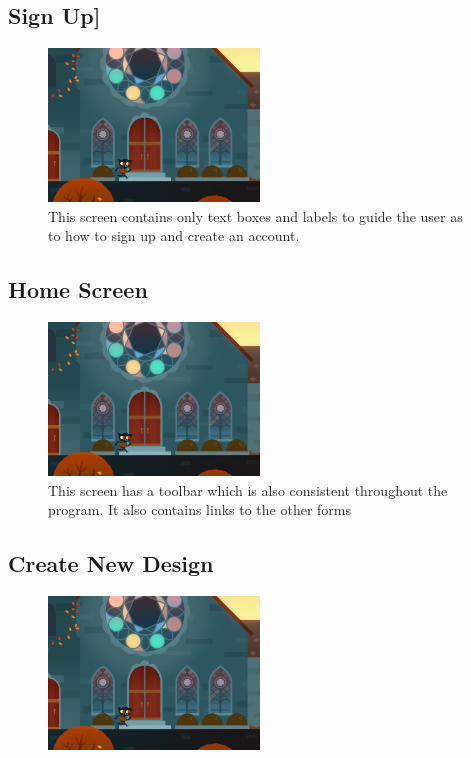 \documentclass[oneside,openany,11pt,a4paper]{report}
\begin{document}
\subsection{Sign Up]}
\begin{figure}[H]
	\centering
	\includegraphics[width=0.5\textwidth]{sd3.png}
	\caption{This screen contains only text boxes and labels to guide the user as to how to sign up and create an account.}
\end{figure}

\subsection{Home Screen}
\begin{figure}[H]
	\centering
	\includegraphics[width=0.5\textwidth]{sd4.png}
	\caption{This screen has a toolbar which is also consistent throughout the program. It also contains links to the other forms }
\end{figure}

\subsection{Create New Design}
\begin{figure}[H]
	\centering
	\includegraphics[width=0.5\textwidth]{sd5.png}
	\caption{}
\end{figure}
\end{document}
